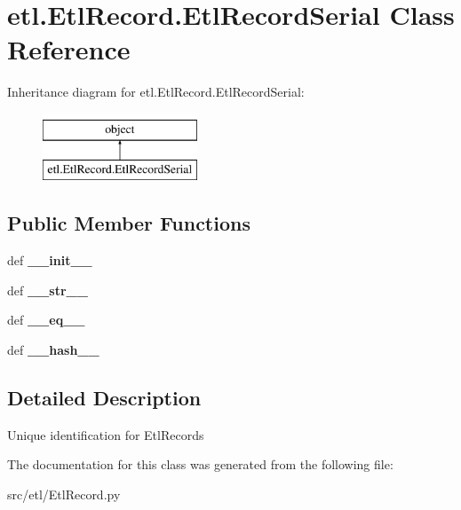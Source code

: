 \hypertarget{classetl_1_1EtlRecord_1_1EtlRecordSerial}{\section{etl.\-Etl\-Record.\-Etl\-Record\-Serial Class Reference}
\label{classetl_1_1EtlRecord_1_1EtlRecordSerial}
}
Inheritance diagram for etl.\-Etl\-Record.\-Etl\-Record\-Serial\-:\begin{figure}[H]
\begin{center}
\leavevmode
\includegraphics[height=2.000000cm]{classetl_1_1EtlRecord_1_1EtlRecordSerial}
\end{center}
\end{figure}
\subsection*{Public Member Functions}
\begin{DoxyCompactItemize}
\item 
\hypertarget{classetl_1_1EtlRecord_1_1EtlRecordSerial_afe0617aba86f91f92087560d196fedb1}{def {\bfseries \-\_\-\-\_\-init\-\_\-\-\_\-}}\label{classetl_1_1EtlRecord_1_1EtlRecordSerial_afe0617aba86f91f92087560d196fedb1}

\item 
\hypertarget{classetl_1_1EtlRecord_1_1EtlRecordSerial_a61fbf9fc63e6beb391a4daa2c38bb1e7}{def {\bfseries \-\_\-\-\_\-str\-\_\-\-\_\-}}\label{classetl_1_1EtlRecord_1_1EtlRecordSerial_a61fbf9fc63e6beb391a4daa2c38bb1e7}

\item 
\hypertarget{classetl_1_1EtlRecord_1_1EtlRecordSerial_a41e38b3ab463df8ce3e7ce3e876bf59f}{def {\bfseries \-\_\-\-\_\-eq\-\_\-\-\_\-}}\label{classetl_1_1EtlRecord_1_1EtlRecordSerial_a41e38b3ab463df8ce3e7ce3e876bf59f}

\item 
\hypertarget{classetl_1_1EtlRecord_1_1EtlRecordSerial_afe8efc4bd2c8b82802705caf8ded0390}{def {\bfseries \-\_\-\-\_\-hash\-\_\-\-\_\-}}\label{classetl_1_1EtlRecord_1_1EtlRecordSerial_afe8efc4bd2c8b82802705caf8ded0390}

\end{DoxyCompactItemize}


\subsection{Detailed Description}
\begin{DoxyVerb}Unique identification for EtlRecords\end{DoxyVerb}
 

The documentation for this class was generated from the following file\-:\begin{DoxyCompactItemize}
\item 
src/etl/Etl\-Record.\-py\end{DoxyCompactItemize}
